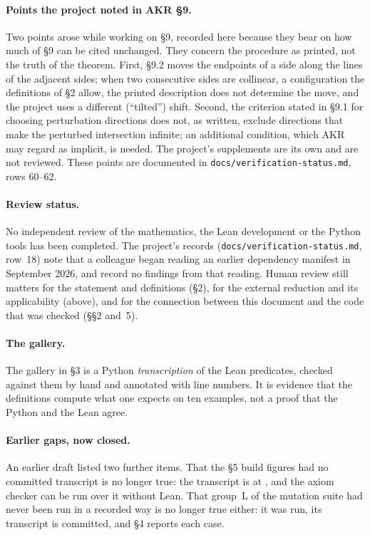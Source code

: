 \documentclass[11pt]{article}
\newcommand{\code}[1]{\texttt{\small #1}}
\begin{document}
\paragraph{Points the project noted in AKR \S9.} Two points arose while
working on \S9, recorded here because they bear on how much of \S9 can be
cited unchanged. They concern the procedure as printed, not the truth of the
theorem. First, \S9.2 moves the endpoints of a side along the lines of the
adjacent sides; when two consecutive sides are collinear, a configuration the
definitions of \S2 allow, the printed description does not determine the
move, and the project uses a different (``tilted'') shift. Second, the
criterion stated in \S9.1 for choosing perturbation directions does not, as
written, exclude directions that make the perturbed intersection infinite; an
additional condition, which AKR may regard as implicit, is needed. The project's
supplements are its own and are not reviewed. These points are documented in
\code{docs/verification-status.md}, rows 60--62.

\paragraph{Review status.} No independent review of the mathematics, the Lean
development or the Python tools has been completed. The project's records
(\code{docs/verification-status.md}, row~18) note that a colleague began
reading an earlier dependency manifest in September 2026, and record no
findings from that reading. Human review still matters for the statement and
definitions (\S2), for the external reduction and its applicability (above),
and for the connection between this document and the code that was checked
(\S\S2 and~5).

\paragraph{The gallery.} The gallery in \S3 is a Python \emph{transcription}
of the Lean predicates, checked against them by hand and annotated with line
numbers. It is evidence that the definitions compute what one expects on ten
examples, not a proof that the Python and the Lean agree.

{\sloppy\paragraph{Earlier gaps, now closed.} An earlier draft listed two further
items. That the \S5 build figures had no committed transcript is no longer
true: the transcript is at \hllogpath, and the axiom checker can be run over it
without Lean. That group~L of the mutation suite had never been run in a
recorded way is no longer true either: it was run, its transcript is
committed, and \S4 reports each case.\par}
\end{document}
